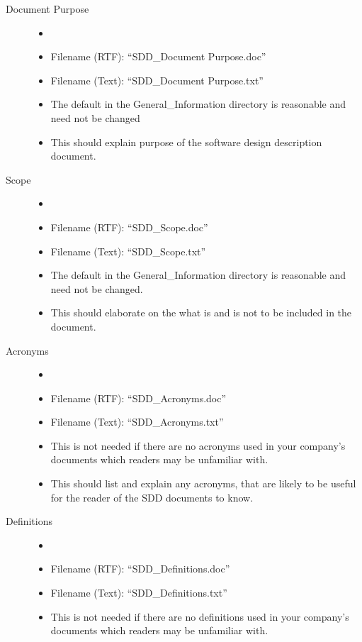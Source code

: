 \documentclass{mcscert}
\begin{document}
  \begin{description}
		\item[Document Purpose\label{itm:doc-purpose}]
		\begin{itemize}
		  \item[]
		  \item Filename (RTF): ``SDD\_Document Purpose.doc''
		  \item Filename (Text): ``SDD\_Document Purpose.txt''
		  \item The default in the General\_Information directory is reasonable and need not be changed
		  \item This should explain purpose of the software design description document.
		\end{itemize}
		\item[Scope\label{itm:scope}]
		\begin{itemize}
		  \item[]
		  \item Filename (RTF): ``SDD\_Scope.doc''
		  \item Filename (Text): ``SDD\_Scope.txt''
		  \item The default in the General\_Information directory is reasonable and need not be changed.
		  \item This should elaborate on the what is and is not to be included in the document.
		\end{itemize}
		\item[Acronyms\label{itm:acronyms}]
		\begin{itemize}
		  \item[]
		  \item Filename (RTF): ``SDD\_Acronyms.doc''
		  \item Filename (Text): ``SDD\_Acronyms.txt''
		  \item This is not needed if there are no acronyms used in your company's documents which readers may be unfamiliar with.
		  \item This should list and explain any acronyms, that are likely to be useful for the reader of the SDD documents to know.
		\end{itemize}
		\item[Definitions\label{itm:definitions}]
		\begin{itemize}
		  \item[]
		  \item Filename (RTF): ``SDD\_Definitions.doc''
		  \item Filename (Text): ``SDD\_Definitions.txt''
		  \item This is not needed if there are no definitions used in your company's documents which readers may be unfamiliar with.

\end{itemize}
\end{description}
\end{document}
